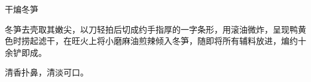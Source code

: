 \begin{recipe}{干煸冬笋}

\ingredients


\cooking

冬笋去壳取其嫩尖，以刀轻拍后切成约手指厚的一字条形，用滚油微炸，呈现鸭黄色时捞起滤干，在旺火上将小磨麻油煎辣倾入冬笋，随即将所有辅料放进，煸约十余铲即成。

\notes

清香扑鼻，清淡可口。

\end{recipe}

